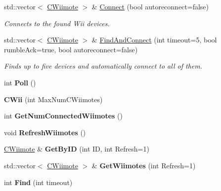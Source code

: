 \begin{DoxyCompactItemize}
\item 
std\-::vector$<$ \hyperlink{class_c_wiimote}{C\-Wiimote} $>$ \& \hyperlink{class_c_wii_aae588e4b73fc2cfe2a50dcc6d23e695d}{Connect} (bool autoreconnect=false)
\begin{DoxyCompactList}\small\item\em Connects to the found Wii devices. \end{DoxyCompactList}\item 
std\-::vector$<$ \hyperlink{class_c_wiimote}{C\-Wiimote} $>$ \& \hyperlink{class_c_wii_ab6ea1b11c12f707d410bf36fee0b16ed}{Find\-And\-Connect} (int timeout=5, bool rumble\-Ack=true, bool autoreconnect=false)
\begin{DoxyCompactList}\small\item\em Finds up to five devices and automatically connect to all of them. \end{DoxyCompactList}\item 
\hypertarget{class_c_wii_acc7affc0e84327f24bd20ef10930f66e}{int {\bfseries Poll} ()}\label{class_c_wii_acc7affc0e84327f24bd20ef10930f66e}

\item 
\hypertarget{class_c_wii_af61aa748b5c06d551d2e0ca4254f815d}{{\bfseries C\-Wii} (int Max\-Num\-C\-Wiimotes)}\label{class_c_wii_af61aa748b5c06d551d2e0ca4254f815d}

\item 
\hypertarget{class_c_wii_a0e0000682a9469cabc60b6107631fec8}{int {\bfseries Get\-Num\-Connected\-Wiimotes} ()}\label{class_c_wii_a0e0000682a9469cabc60b6107631fec8}

\item 
\hypertarget{class_c_wii_a1ad5ec6adb3939eb2bda5596fb7d6f4a}{void {\bfseries Refresh\-Wiimotes} ()}\label{class_c_wii_a1ad5ec6adb3939eb2bda5596fb7d6f4a}

\item 
\hypertarget{class_c_wii_a1ab41805910976445e88c19f6866c8cb}{\hyperlink{class_c_wiimote}{C\-Wiimote} \& {\bfseries Get\-By\-I\-D} (int I\-D, int Refresh=1)}\label{class_c_wii_a1ab41805910976445e88c19f6866c8cb}

\item 
\hypertarget{class_c_wii_a627e741a6b2694b0e98257777e7ca713}{std\-::vector$<$ \hyperlink{class_c_wiimote}{C\-Wiimote} $>$ \& {\bfseries Get\-Wiimotes} (int Refresh=1)}\label{class_c_wii_a627e741a6b2694b0e98257777e7ca713}

\item 
\hypertarget{class_c_wii_aee1843485afecca45a788df92a56941f}{int {\bfseries Find} (int timeout)}\label{class_c_wii_aee1843485afecca45a788df92a56941f}


\end{DoxyCompactItemize}
